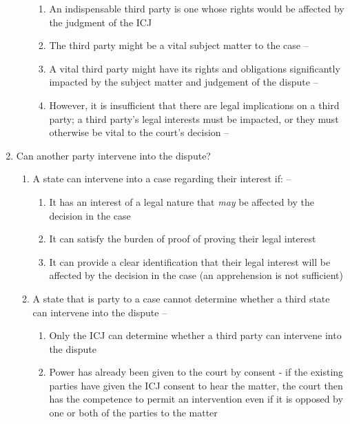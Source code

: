 \begin{enumerate}
\begin{enumerate}
        \begin{enumerate}
            \item An indispensable third party is one whose rights would be affected by the judgment of the ICJ
            \item The third party might be a vital subject matter to the case -- 
            \item A vital third party might have its rights and obligations significantly impacted by the subject matter and judgement of the dispute -- 
            \item However, it is insufficient that there are legal implications on a third party; a third party's legal interests must be impacted, or they must otherwise be vital to the court's decision -- 
        \end{enumerate}
    \end{enumerate}
    \item Can another party intervene into the dispute?
    \begin{enumerate}
        \item A state can intervene into a case regarding their interest if: -- 
        \begin{enumerate}
            \item It has an interest of a legal nature that \textit{may} be affected by the decision in the case
            \item It can satisfy the burden of proof of proving their legal interest
            \item It can provide a clear identification that their legal interest will be affected by the decision in the case (an apprehension is not sufficient)
        \end{enumerate}
        \item A state that is party to a case cannot determine whether a third state can intervene into the dispute -- 
        \begin{enumerate}
            \item Only the ICJ can determine whether a third party can intervene into the dispute
            \item Power has already been given to the court by consent - if the existing parties have given the ICJ consent to hear the matter, the court then has the competence to permit an intervention even if it is opposed by one or both of the parties to the matter

\end{enumerate}
\end{enumerate}
\end{enumerate}
